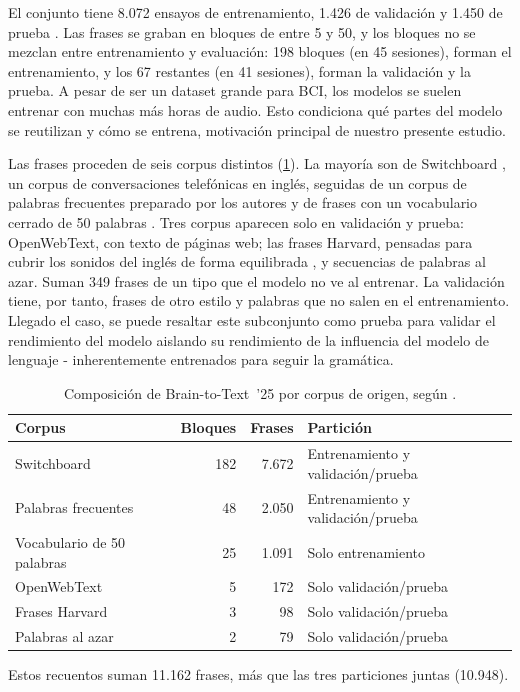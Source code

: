 El conjunto tiene 8.072 ensayos de entrenamiento, 1.426 de validación y 1.450 de prueba \cite{lightbeam}. Las frases se graban en bloques de entre 5 y 50, y los bloques no se mezclan entre entrenamiento y evaluación: 198 bloques (en 45 sesiones), forman el entrenamiento, y los 67 restantes (en 41 sesiones), forman la validación y la prueba. A pesar de ser un dataset grande para BCI, los modelos se suelen entrenar con muchas más horas de audio. Esto condiciona qué partes del modelo se reutilizan y cómo se entrena, motivación principal de nuestro presente estudio.

Las frases proceden de seis corpus distintos (\cref{tab:b2t25-splits}). La mayoría son de Switchboard \cite{godfrey1992switchboard}, un corpus de conversaciones telefónicas en inglés, seguidas de un corpus de palabras frecuentes preparado por los autores y de frases con un vocabulario cerrado de 50 palabras \cite{b2t25}. Tres corpus aparecen solo en validación y prueba: OpenWebText, con texto de páginas web; las frases Harvard, pensadas para cubrir los sonidos del inglés de forma equilibrada \cite{ieee1969}, y secuencias de palabras al azar. Suman 349 frases de un tipo que el modelo no ve al entrenar. La validación tiene, por tanto, frases de otro estilo y palabras que no salen en el entrenamiento. Llegado el caso, se puede resaltar este subconjunto como prueba para validar el rendimiento del modelo aislando su rendimiento de la influencia del modelo de lenguaje - inherentemente entrenados para seguir la gramática.

\begin{table}[htbp]
  \centering
  \caption[Composición de Brain-to-Text~'25 por corpus de origen]{Composición de Brain-to-Text~'25 por corpus de origen, según \cite{lightbeam}.}
  \label{tab:b2t25-splits}
  \small
  \begin{threeparttable}
  \begin{tabular}{lrrl}
    \toprule
    \textbf{Corpus} & \textbf{Bloques} & \textbf{Frases}\tnote{a} & \textbf{Partición} \\
    \midrule
    Switchboard                & 182 & 7.672 & Entrenamiento y validación/prueba \\
    Palabras frecuentes        & 48  & 2.050 & Entrenamiento y validación/prueba \\
    Vocabulario de 50 palabras & 25  & 1.091 & Solo entrenamiento \\
    OpenWebText                & 5   & 172   & Solo validación/prueba \\
    Frases Harvard             & 3   & 98    & Solo validación/prueba \\
    Palabras al azar           & 2   & 79    & Solo validación/prueba \\
    \bottomrule
  \end{tabular}
  \begin{tablenotes}\footnotesize
    \item[a] Estos recuentos suman 11.162 frases, más que las tres particiones juntas (10.948).
  \end{tablenotes}
  \end{threeparttable}
\end{table}

